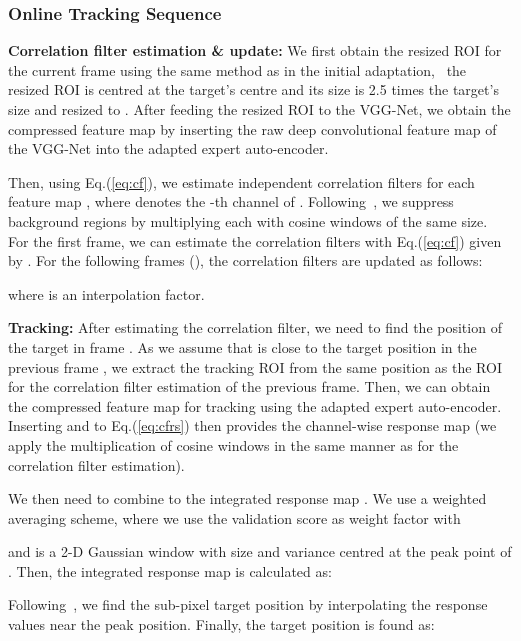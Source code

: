 \documentclass[10pt,twocolumn,letterpaper]{article}
\begin{document}
\subsubsection{Online Tracking Sequence} \label{sec:onlintTrack}
\hspace{3mm}\textbf{Correlation filter estimation \& update: }
We first obtain the resized ROI for the current frame  using the same method as in the initial adaptation, \ie\ the resized ROI is centred at the target's centre and its size is 2.5 times the target's size and resized to .
After feeding the resized ROI to the VGG-Net, we obtain the compressed feature map  by inserting the raw deep convolutional feature map of the VGG-Net into the adapted expert auto-encoder.

Then, using Eq.(\ref{eq:cf}), we estimate independent correlation filters  for each feature map , where  denotes the -th channel of .
Following~\cite{ref:KCF}, we suppress background regions by multiplying each  with cosine windows of the same size.
For the first frame, we can estimate the correlation filters  with Eq.(\ref{eq:cf}) given by .
For the following frames (), the correlation filters are updated as follows:

where  is an interpolation factor.


\textbf{Tracking: }
After estimating the correlation filter, we need to find the position  of the target in frame . 
As we assume that  is close to the target position in the previous frame , we extract the tracking ROI from the same position as the ROI for the correlation filter estimation of the previous frame.
Then, we can obtain the compressed feature map  for tracking using the adapted expert auto-encoder. 
Inserting  and  to Eq.(\ref{eq:cfrs}) then provides the channel-wise response map  
(we apply the multiplication of cosine windows in the same manner as for the correlation filter estimation).

We then need to combine  to the integrated response map . 
We use a weighted averaging scheme, where we use the validation score  as weight factor with

and  is a 2-D Gaussian window with size  and variance  centred at the peak point  of . 
Then, the integrated response map is calculated as:
\vspace{-2mm}

Following~\cite{ref:ACFN}, we find the sub-pixel target position  by interpolating the response values near the peak position.
Finally, the target position  is found as:
\end{document}
